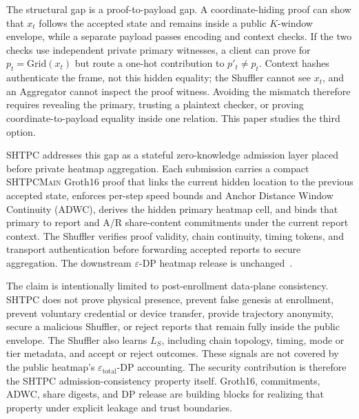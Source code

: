 \documentclass[journal]{IEEEtran}
\theoremstyle{definition}
\theoremstyle{plain}
\begin{document}
The structural gap is a proof-to-payload gap. A coordinate-hiding proof can
show that \(x_t\) follows the accepted state and remains inside a public
\(K\)-window envelope, while a separate payload passes encoding and context
checks. If the two checks use independent private primary witnesses, a client
can prove for \(p_t=\mathrm{Grid}(x_t)\) but route a one-hot contribution to
\(p'_t\ne p_t\). Context hashes authenticate the frame, not this hidden
equality; the Shuffler cannot see \(x_t\), and an Aggregator cannot inspect the
proof witness. Avoiding the mismatch therefore requires revealing the primary,
trusting a plaintext checker, or proving coordinate-to-payload equality inside
one relation. This paper studies the third option.

\textsc{SHTPC} addresses this gap as a stateful zero-knowledge admission layer
placed before private heatmap aggregation. Each submission carries a compact
\textsc{SHTPCMain} Groth16 proof that links the current hidden location to the
previous accepted state, enforces per-step speed bounds and Anchor Distance
Window Continuity (ADWC), derives the hidden primary heatmap cell, and binds
that primary to report and A/R share-content commitments under the current
report context. The Shuffler verifies proof validity, chain continuity, timing
tokens, and transport authentication before forwarding accepted reports to
secure aggregation. The downstream \(\varepsilon\)-DP heatmap release is
unchanged~\cite{Balle2019privacy}.

The claim is intentionally limited to post-enrollment data-plane consistency.
\textsc{SHTPC} does not prove physical presence, prevent false genesis at
enrollment, prevent voluntary credential or device transfer, provide trajectory
anonymity, secure a malicious Shuffler, or reject reports that remain fully
inside the public envelope. The Shuffler also learns \(L_S\), including chain
topology, timing, mode or tier metadata, and accept or reject outcomes. These
signals are not covered by the public heatmap's
\(\varepsilon_{\mathrm{total}}\)-DP accounting. The security contribution is
therefore the SHTPC admission-consistency property itself. Groth16,
commitments, ADWC, share digests, and DP release are building blocks for
realizing that property under explicit leakage and trust boundaries.
\end{document}
